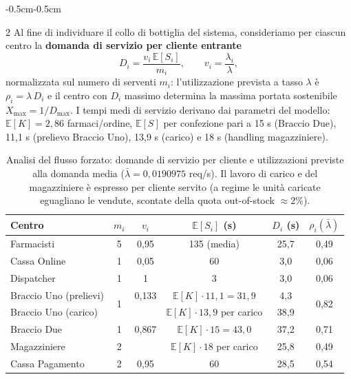 \documentclass{article}
\begin{document}
\begin{adjustwidth}{-0.5cm}{-0.5cm}
\begin{multicols}{2}
Al fine di individuare il collo di bottiglia del sistema, consideriamo per ciascun centro la
\textbf{domanda di servizio per cliente entrante}
\[
D_i = \frac{v_i \, \mathbb{E}[S_i]}{m_i},
\qquad v_i = \frac{\lambda_i}{\lambda},
\]
normalizzata sul numero di serventi $m_i$: l'utilizzazione prevista a tasso $\lambda$ è
$\rho_i = \lambda\, D_i$ e il centro con $D_i$ massimo determina la massima portata sostenibile
$X_{\max} = 1/D_{\max}$. I tempi medi di servizio derivano dai parametri del modello:
$\mathbb{E}[K] = 2{,}86$ farmaci/ordine, $\mathbb{E}[S]$ per confezione pari a 15 s (Braccio Due),
11{,}1 s (prelievo Braccio Uno), 13{,}9 s (carico) e 18 s (handling magazziniere).
\end{multicols}

\begin{table}[ht]
\centering
\renewcommand{\arraystretch}{1.25}
\begin{tabular}{|l|c|c|c|c|c|}
\hline
\textbf{Centro} & $m_i$ & $v_i$ & $\mathbb{E}[S_i]$ (s) & $D_i$ (s) & $\rho_i(\bar\lambda)$ \\
\hline
Farmacisti            & 5 & 0{,}95  & 135 (media)                          & 25{,}7 & 0{,}49  \\
Cassa Online          & 1 & 0{,}05  & 60                                   & 3{,}0  & 0{,}06  \\
Dispatcher            & 1 & 1       & 3                                    & 3{,}0  & 0{,}06  \\
Braccio Uno (prelievi)& \multirow{2}{*}{1} & 0{,}133 & $\mathbb{E}[K]\cdot 11{,}1 = 31{,}9$ & 4{,}3  & \multirow{2}{*}{0{,}82} \\
Braccio Uno (carico)  &   &         & $\mathbb{E}[K]\cdot 13{,}9$ per carico & 38{,}9 &         \\
Braccio Due           & 1 & 0{,}867 & $\mathbb{E}[K]\cdot 15 = 43{,}0$     & 37{,}2 & 0{,}71  \\
Magazziniere          & 2 &         & $\mathbb{E}[K]\cdot 18$ per carico  & 25{,}8 & 0{,}49  \\
Cassa Pagamento       & 2 & 0{,}95  & 60                                   & 28{,}5 & 0{,}54  \\
\hline
\end{tabular}
\caption{Analisi del flusso forzato: domande di servizio per cliente e utilizzazioni previste
alla domanda media ($\bar\lambda = 0{,}0190975$ req/s). Il
lavoro di carico e del magazziniere è espresso per cliente servito (a regime le unità caricate
eguagliano le vendute, scontate della quota out-of-stock $\approx 2\%$).}
\end{table}


\end{adjustwidth}
\end{document}
